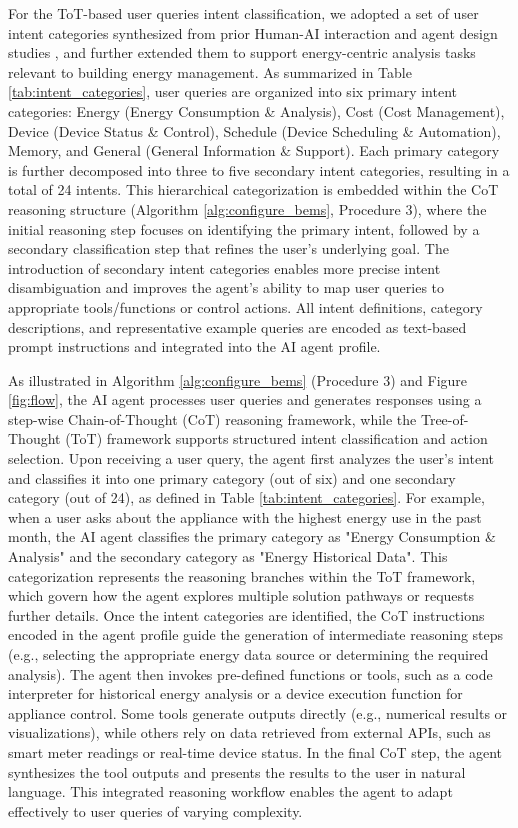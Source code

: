 \documentclass[final,3p,times]{elsarticle}
\begin{document}
For the ToT-based user queries intent classification, we adopted a set of user intent categories synthesized from prior Human-AI interaction and agent design studies \cite{jin2023human, king2024sasha}, and further extended them to support energy-centric analysis tasks relevant to building energy management. As summarized in Table \ref{tab:intent_categories}, user queries are organized into six primary intent categories: Energy (Energy Consumption \& Analysis), Cost (Cost Management), Device (Device Status \& Control), Schedule (Device Scheduling \& Automation), Memory, and General (General Information \& Support). Each primary category is further decomposed into three to five secondary intent categories, resulting in a total of 24 intents. This hierarchical categorization is embedded within the CoT reasoning structure (Algorithm \ref{alg:configure_bems}, Procedure 3), where the initial reasoning step focuses on identifying the primary intent, followed by a secondary classification step that refines the user’s underlying goal. The introduction of secondary intent categories enables more precise intent disambiguation and improves the agent’s ability to map user queries to appropriate tools/functions or control actions. All intent definitions, category descriptions, and representative example queries are encoded as text-based prompt instructions and integrated into the AI agent profile.

As illustrated in Algorithm \ref{alg:configure_bems} (Procedure 3) and Figure \ref{fig:flow}, the AI agent processes user queries and generates responses using a step-wise Chain-of-Thought (CoT) reasoning framework, while the Tree-of-Thought (ToT) framework supports structured intent classification and action selection. Upon receiving a user query, the agent first analyzes the user’s intent and classifies it into one primary category (out of six) and one secondary category (out of 24), as defined in Table \ref{tab:intent_categories}. For example, when a user asks about the appliance with the highest energy use in the past month, the AI agent classifies the primary category as "Energy Consumption \& Analysis" and the secondary category as "Energy Historical Data". This categorization represents the reasoning branches within the ToT framework, which govern how the agent explores multiple solution pathways or requests further details. Once the intent categories are identified, the CoT instructions encoded in the agent profile guide the generation of intermediate reasoning steps (e.g., selecting the appropriate energy data source or determining the required analysis). The agent then invokes pre-defined functions or tools, such as a code interpreter for historical energy analysis or a device execution function for appliance control. Some tools generate outputs directly (e.g., numerical results or visualizations), while others rely on data retrieved from external APIs, such as smart meter readings or real-time device status. In the final CoT step, the agent synthesizes the tool outputs and presents the results to the user in natural language. This integrated reasoning workflow enables the agent to adapt effectively to user queries of varying complexity.
\end{document}
